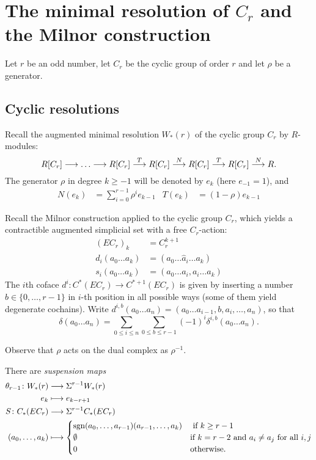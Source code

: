
\section{The minimal resolution of $C_r$ and the Milnor construction}

Let $r$ be an odd number, let $C_r$ be the cyclic group of order $r$ and let $\rho$ be a generator.

\subsection{Cyclic resolutions}

Recall the augmented minimal resolution $W_*(r)$ of the cyclic group $C_r$ by $R$-modules:
\[R[C_r]\longrightarrow\ldots \longrightarrow R[C_r]\overset{T}{\longrightarrow} R[C_r]\overset{N}{\longrightarrow}R[C_r]\overset{T}{\longrightarrow} R[C_r] \overset{N}{\longrightarrow} R.\]
The generator $\rho$ in degree $k\geq -1$ will be denoted by $e_k$ (here $e_{-1}=1$), and
\begin{align*}
	N(e_k) &= \sum_{i=0}^{r-1} \rho^ie_{k-1} &
	T(e_k) &= (1-\rho)e_{k-1}
\end{align*}

Recall the Milnor construction applied to the cyclic group $C_r$, which yields a contractible augmented simplicial set with a free $C_r$-action:
\begin{align*}
	(EC_r)_k &= C_r^{k+1}\\
	d_i(a_0\ldots a_k) &= (a_0\ldots\hat{a}_i\ldots a_k) \\
	s_i(a_0\ldots a_k) &= (a_0\ldots a_i,a_i\ldots a_k)
\end{align*}
The $i$th coface $d^i\colon C^*(EC_r)\to C^{*+1}(EC_r)$ is given by inserting a number $b\in \{0,\ldots,r-1\}$ in $i$-th position in all possible ways (some of them yield degenerate cochains). Write $d^{i,b}(a_0\ldots a_n) = (a_0\ldots a_{i-1},b,a_i,\ldots, a_n)$, so that
\[\delta(a_0\ldots a_n) = \sum_{0\leq i\leq n}\sum_{0\leq b\leq r-1}(-1)^i \delta^{i,b}(a_0\ldots a_n).\]
\begin{warning}
	Observe that $\rho$ acts on the dual complex as $\rho^{-1}$.
\end{warning}
There are \emph{suspension maps}
\begin{align*}
	\theta_{r-1}\colon W_*(r) & \longrightarrow \Sigma^{r-1}W_*(r) \\
	e_k & \longmapsto e_{k-r+1} \\
	S\colon C_*(EC_r)&\longrightarrow \Sigma^{r-1}C_*(EC_r) \\
	(a_0,\ldots,a_k) & \longmapsto \begin{cases}
		{\operatorname*{sgn}(a_{0},\ldots,a_{r-1})} (a_{r-1},\ldots,a_{k}) & \text{ if $k\geq r-1$} \\
		\emptyset & \text{if $k = r-2$ and $a_i\neq a_j$ for all $i,j$} \\
		0 & \text{otherwise.}
	\end{cases}
\end{align*}

